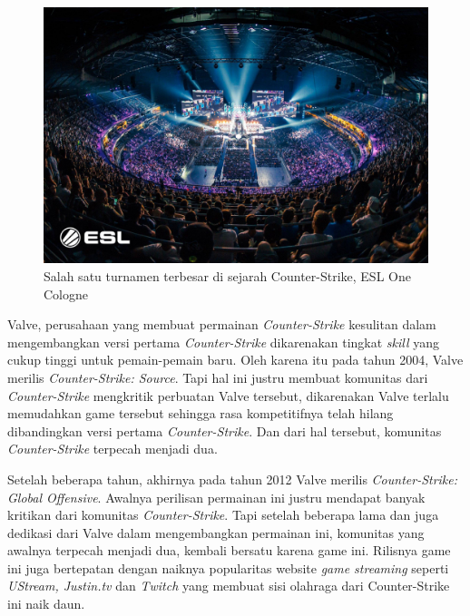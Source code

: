 \documentclass[12pt]{article}
\begin{document}
    \begin{figure}[H]
    \centering
    \includegraphics[width=1.0\textwidth]{images/1_qkFJj0JlKig9wgiNKYMJCg.jpeg}
    \caption{Salah satu turnamen terbesar di sejarah Counter-Strike, ESL One
    Cologne}
    \end{figure}

    Valve, perusahaan yang membuat permainan \emph{Counter-Strike} kesulitan
    dalam mengembangkan versi pertama \emph{Counter-Strike} dikarenakan
    tingkat \emph{skill} yang cukup tinggi untuk pemain-pemain baru. Oleh
    karena itu pada tahun 2004, Valve merilis \emph{Counter-Strike: Source}.
    Tapi hal ini justru membuat komunitas dari \emph{Counter-Strike}
    mengkritik perbuatan Valve tersebut, dikarenakan Valve terlalu
    memudahkan game tersebut sehingga rasa kompetitifnya telah hilang
    dibandingkan versi pertama \emph{Counter-Strike}. Dan dari hal tersebut,
    komunitas \emph{Counter-Strike} terpecah menjadi dua.

    Setelah beberapa tahun, akhirnya pada tahun 2012 Valve merilis
    \emph{Counter-Strike: Global Offensive}. Awalnya perilisan permainan ini
    justru mendapat banyak kritikan dari komunitas \emph{Counter-Strike}.
    Tapi setelah beberapa lama dan juga dedikasi dari Valve dalam
    mengembangkan permainan ini, komunitas yang awalnya terpecah menjadi
    dua, kembali bersatu karena game ini. Rilisnya game ini juga bertepatan
    dengan naiknya popularitas website \emph{game streaming} seperti
    \emph{UStream, Justin.tv} dan \emph{Twitch} yang membuat sisi olahraga
    dari Counter-Strike ini naik daun.
\end{document}
